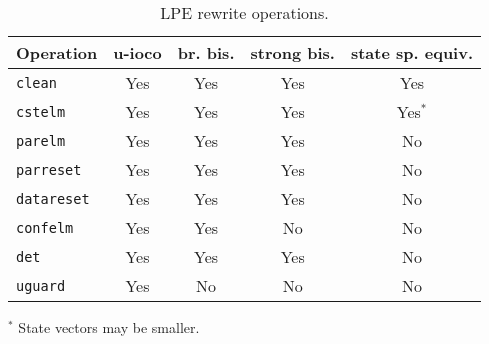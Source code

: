 \begin{table}[!ht]
\begin{center}
\begin{tabularx}{\linewidth}{X|c|c|c|c|}
\textbf{Operation} & \textbf{u-ioco} & \textbf{br. bis.} & \textbf{strong bis.} & \textbf{state sp. equiv.} \\ \hline
\texttt{clean} & Yes & Yes & Yes & Yes \\ \hline
\texttt{cstelm} & Yes & Yes & Yes & Yes$^{*}$ \\ \hline
\texttt{parelm} & Yes & Yes & Yes & No \\ \hline
\texttt{parreset} & Yes & Yes & Yes & No \\ \hline
\texttt{datareset} & Yes & Yes & Yes & No \\ \hline
\texttt{confelm} & Yes & Yes & No & No \\ \hline
\texttt{det} & Yes & Yes & Yes & No \\ \hline
\texttt{uguard} & Yes & No & No & No \\ \hline
\end{tabularx}
\caption{LPE rewrite operations.}
$^{*}$ State vectors may be smaller.
\label{tab:lperewriteopsprops}
\end{center}
\end{table}



